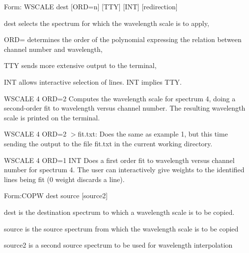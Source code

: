 {\newpage\clearpage
{}%
\begin{command}
  \item[Form: WSCALE dest {[ORD=n]} {[TTY]} {[INT]} {[redirection]}\hfill]{}
  \item[dest]{selects the spectrum for which the wavelength scale is to apply,}
  \item[ORD=]{determines the order of the polynomial 
       expressing the relation between channel number and wavelength,}
  \item[TTY]{sends more extensive output to the terminal,}
  \item[INT]{allows interactive selection of lines.  INT implies TTY.}
\end{command}%
\lthtmlfigureZ
\lthtmlcheckvsize\clearpage}

{\newpage\clearpage
{}%
\begin{example}
  \item[WSCALE 4 ORD=2\hfill]{ Computes the wavelength scale for spectrum
       4, doing a second-order fit to wavelength versus channel number. The
       resulting wavelength scale is printed on the terminal.}
\par
\item[WSCALE 4 ORD=2 $>$fit.txt:\hfill]{ Does the same as example 1, but
       this time sending the output to the file fit.txt in the
       current working directory.}
\par
\item[WSCALE 4 ORD=1 INT\hfill]{ Does a first order fit to wavelength
       versus channel number for spectrum 4.  The user can interactively
       give weights to the identified lines being fit (0 weight discards a
       line).}
\end{example}%
\lthtmlfigureZ
\lthtmlcheckvsize\clearpage}

{\newpage\clearpage
{}%
\begin{command}
  \item[Form:COPW dest source {[source2]}\hfill]{}
  \item[dest]{is the destination spectrum to which a wavelength scale is to
       be copied.}
  \item[source]{is the source spectrum from which the wavelength scale is
       to be copied}
  \item[source2]{is a second source spectrum to be used for wavelength
       interpolation}
\end{command}%
\lthtmlfigureZ
\lthtmlcheckvsize\clearpage}

